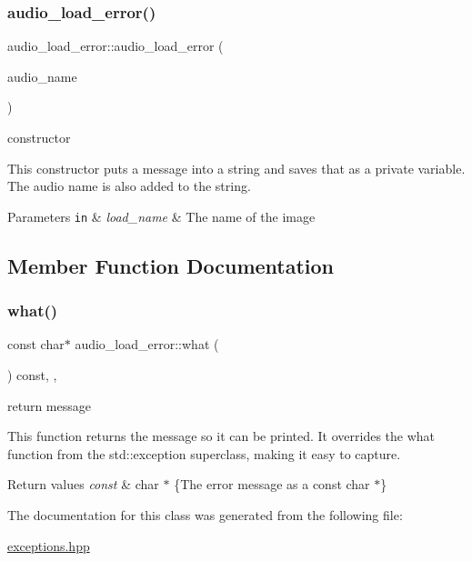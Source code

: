 \subsubsection{\texorpdfstring{audio\+\_\+load\+\_\+error()}{audio\_load\_error()}}
{\footnotesize\ttfamily audio\+\_\+load\+\_\+error\+::audio\+\_\+load\+\_\+error (\begin{DoxyParamCaption}\item[{const std\+::string \&}]{audio\+\_\+name }\end{DoxyParamCaption})\hspace{0.3cm}{\ttfamily [inline]}}



constructor 

This constructor puts a message into a string and saves that as a private variable. The audio name is also added to the string.


\begin{DoxyParams}[1]{Parameters}
\mbox{\tt in}  & {\em load\+\_\+name} & The name of the image \\
\hline
\end{DoxyParams}


\subsection{Member Function Documentation}
\mbox{\label{classaudio__load__error_a364ad9c1cb7de37f0cb3e33dbebbaa47}} 
\subsubsection{\texorpdfstring{what()}{what()}}
{\footnotesize\ttfamily const char$\ast$ audio\+\_\+load\+\_\+error\+::what (\begin{DoxyParamCaption}{ }\end{DoxyParamCaption}) const\hspace{0.3cm}{\ttfamily [inline]}, {\ttfamily [override]}, {\ttfamily [noexcept]}}



return message 

This function returns the message so it can be printed. It overrides the what function from the std\+::exception superclass, making it easy to capture.


\begin{DoxyRetVals}{Return values}
{\em const} & char $\ast$ \{The error message as a const char $\ast$\} \\
\hline
\end{DoxyRetVals}


The documentation for this class was generated from the following file\+:\begin{DoxyCompactItemize}
\item 
\hyperlink{exceptions_8hpp}{exceptions.\+hpp}\end{DoxyCompactItemize}
